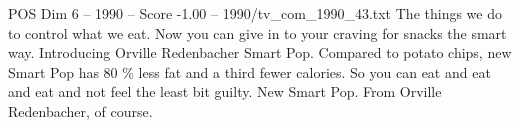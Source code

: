\begin{textsample}{POS Dim 6 – 1990 – Score -1.00 – 1990/tv\_com\_1990\_43.txt}  \label{ex:f6_pos_080}
The things we do to control what we eat.
Now you can give in to your craving for snacks the smart way.
Introducing Orville Redenbacher Smart Pop.
Compared to potato chips, new Smart Pop has 80 \% less fat and a third fewer calories.
So you can eat and eat and eat and not feel the least bit guilty.
New Smart Pop.
From Orville Redenbacher, of course.

\end{textsample}
